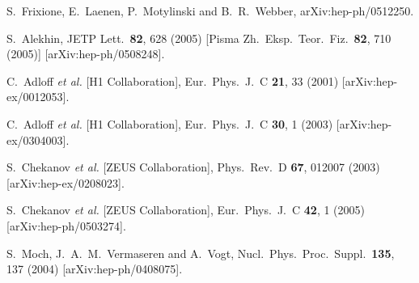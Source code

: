 \documentclass[12pt]{iopart}
\begin{document}
\begin{thebibliography}{99}
\cite{Frixione:2005vw}
  S.~Frixione, E.~Laenen, P.~Motylinski and B.~R.~Webber,
  arXiv:hep-ph/0512250.





  S.~Alekhin,
  JETP Lett.\  {\bf 82}, 628 (2005)
  [Pisma Zh.\ Eksp.\ Teor.\ Fiz.\  {\bf 82}, 710 (2005)]
  [arXiv:hep-ph/0508248].

  C.~Adloff {\it et al.}  [H1 Collaboration],
  Eur.\ Phys.\ J.\ C {\bf 21}, 33 (2001)
  [arXiv:hep-ex/0012053].

  C.~Adloff {\it et al.}  [H1 Collaboration],
  Eur.\ Phys.\ J.\ C {\bf 30}, 1 (2003)
  [arXiv:hep-ex/0304003].


  S.~Chekanov {\it et al.}  [ZEUS Collaboration],
  Phys.\ Rev.\ D {\bf 67}, 012007 (2003)
  [arXiv:hep-ex/0208023].

  S.~Chekanov {\it et al.}  [ZEUS Collaboration],
  Eur.\ Phys.\ J.\ C {\bf 42}, 1 (2005)
  [arXiv:hep-ph/0503274].

  S.~Moch, J.~A.~M.~Vermaseren and A.~Vogt,
  Nucl.\ Phys.\ Proc.\ Suppl.\  {\bf 135}, 137 (2004)
  [arXiv:hep-ph/0408075].


\end{thebibliography}
\end{document}

